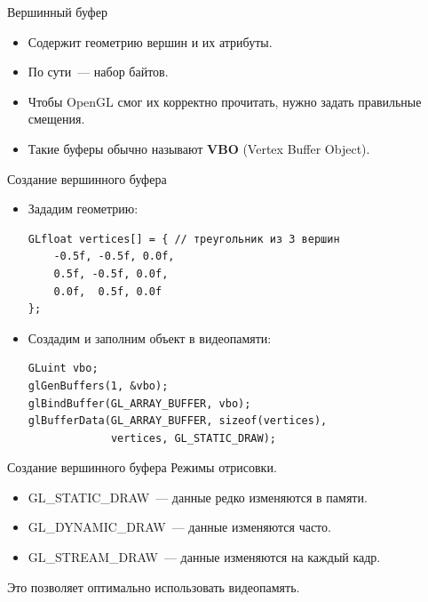 \documentclass[aspectration=1610,t]{beamer}
\begin{document}
\begin{frame}[fragile]{Вершинный буфер}
    \begin{itemize}
        \item Содержит геометрию вершин и их атрибуты.
        \item По сути~--- набор байтов.
        \item Чтобы OpenGL смог их корректно прочитать, нужно задать правильные смещения.
        \item Такие буферы обычно называют {\bf VBO} (Vertex Buffer Object).
    \end{itemize}
\end{frame}

\begin{frame}[fragile]{Создание вершинного буфера}
    \begin{itemize}
        \item Зададим геометрию:
            {\small \begin{lstlisting}
GLfloat vertices[] = { // треугольник из 3 вершин
    -0.5f, -0.5f, 0.0f,
    0.5f, -0.5f, 0.0f,
    0.0f,  0.5f, 0.0f
};
            \end{lstlisting}}
        \item Создадим и заполним объект в видеопамяти:
            {\small \begin{lstlisting}
GLuint vbo;
glGenBuffers(1, &vbo);
glBindBuffer(GL_ARRAY_BUFFER, vbo);
glBufferData(GL_ARRAY_BUFFER, sizeof(vertices),
             vertices, GL_STATIC_DRAW);
            \end{lstlisting}}
    \end{itemize}
\end{frame}

\begin{frame}[fragile]{Создание вершинного буфера}
    Режимы отрисовки.
    \begin{itemize}
        \item GL\_STATIC\_DRAW~--- данные редко изменяются в памяти.
        \item GL\_DYNAMIC\_DRAW~--- данные изменяются часто.
        \item GL\_STREAM\_DRAW~--- данные изменяются на каждый кадр.
    \end{itemize}
    Это позволяет оптимально использовать видеопамять.
\end{frame}
\end{document}
